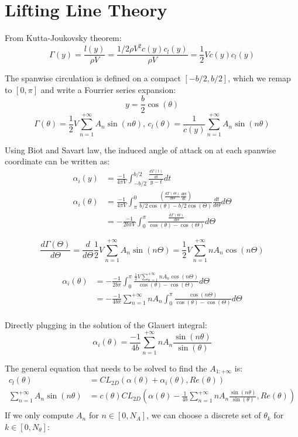 \documentclass[letterpaper,12pt]{article}
\begin{document}
\section{Lifting Line Theory}

From Kutta-Joukovsky theorem:
%
$$\Gamma(y) = \frac{l(y)}{\rho V} = \frac{1/2 \rho V^2 c(y) c_l(y)}{\rho V} =  \frac{1}{2} V c(y) c_l(y)$$

The spanwise circulation is defined on a compact $[-b/2, b/2]$, which we remap to $[0, \pi]$ and write a Fourrier series expansion:
$$y = \frac{b}{2}\cos(\theta)$$
%
$$\Gamma(\theta) = \frac{1}{2} V\sum_{n=1}^{+\infty} A_n \sin(n\theta) \text{,      } c_l(\theta) = \frac 1 {c(y)} \sum_{n=1}^{+\infty} A_n \sin(n\theta)$$

Using Biot and Savart law, the induced angle of attack on at each spanwise coordinate can be written as:
%
	\begin{align*}
		\alpha_i(y) &= \frac{-1}{4\pi V}\int_{-b/2}^{b/2} \frac{\frac{d\Gamma(t)}{dt}}{y-t} dt \\ 
		\alpha_i(\theta) &= \frac{-1}{4\pi V} \int_{\pi}^{0} \frac{\left( \frac{d\Gamma(\Theta)}{d\Theta} \frac{d\Theta}{dt}\right)}{b/2\cos(\theta)-b/2\cos(\Theta)}\frac{dt}{d\Theta} d\Theta	 \\
				 &= -\frac{-1}{2b\pi V} \int_{0}^{\pi} \frac{\frac{d\Gamma(\Theta)}{d\Theta}}{\cos(\theta)-\cos(\Theta)} d\Theta	
	\end{align*}

$$\frac{d\Gamma(\Theta)}{d\Theta} = \frac{d}{d\Theta}\frac12 V\sum_{n=1}^{+\infty} A_n \sin(n\Theta)  = \frac{1}{2} V\sum_{n=1}^{+\infty} n A_n \cos(n\Theta) $$

\begin{align*}
	\alpha_i(\theta) &= -\frac{-1}{2b\pi }  \int_{0}^{\pi} \frac{ \frac{1}{2} V\sum_{n=1}^{+\infty} n A_n \cos(n\Theta) }{\cos(\theta)-\cos(\Theta)} d\Theta	\\
				&= -\frac{-1}{4b\pi }  \sum_{n=1}^{+\infty} n A_n \int_{0}^{\pi} \frac{ \cos(n\Theta) }{\cos(\theta)-\cos(\Theta)} d\Theta	\\
\end{align*}

Directly plugging in the solution of the Glauert integral:
$$ \alpha_i(\theta) = \frac {-1}{4b}  \sum_{n=1}^{+\infty} n A_n \frac{ \sin(n\theta) }{\sin(\theta)} 	$$

The general equation that needs to be solved to find the $A_{1:+\infty}$ is:
%
\begin{align*}
	c_l(\theta) &= CL_{2D} \left( \alpha(\theta) + \alpha_i(\theta), Re(\theta)\right) \\
	\sum_{n=1}^{+\infty} A_n \sin(n\theta) &= c(\theta) CL_{2D} \left( \alpha(\theta) - \frac {1}{4b}  \sum_{n=1}^{+\infty} n A_n \frac{ \sin(n\theta) }{\sin(\theta)} , Re(\theta)\right) \\
\end{align*}
%
If we only compute $A_{n}$ for $n \in [0, N_A]$, we can choose a discrete set of $\theta_k$ for $k \in [0, N_{\theta}]$:
\end{document}

